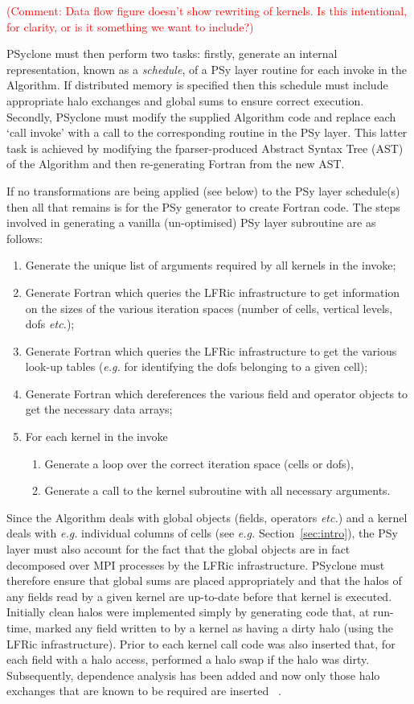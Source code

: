 \documentclass[times]{elsarticle}
\begin{document}
\textcolor{red}{(Comment: Data flow figure doesn't show rewriting of kernels. 
Is this intentional, for clarity, or is it something we want to include?)}

PSyclone must then perform two tasks: firstly, generate an internal
representation, known as a {\em schedule}, of a PSy layer routine for each invoke in
the Algorithm. If distributed memory is specified then this schedule
must include appropriate halo exchanges and global sums to ensure
correct execution. Secondly, PSyclone must modify the supplied Algorithm
code and replace each `call invoke' with a call to the corresponding
routine in the PSy layer. This latter task is achieved by modifying
the fparser-produced Abstract Syntax Tree (AST) of the Algorithm and
then re-generating Fortran from the new AST.

If no transformations are being applied (see below) to the PSy layer
schedule(s) then all that remains is for the PSy generator to create
Fortran code.  The steps involved in generating a vanilla
(un-optimised) PSy layer subroutine are as follows:
\begin{enumerate}
\item Generate the unique list of arguments required by all kernels
  in the invoke;
\item Generate Fortran which queries the LFRic infrastructure to get
  information on the sizes of the various iteration spaces (number of cells,
  vertical levels, dofs {\em etc.});
\item Generate Fortran which queries the LFRic infrastructure to get the
  various look-up tables ({\em e.g.} for identifying the dofs belonging to a
  given cell);
\item Generate Fortran which dereferences the various field and operator
  objects to get the necessary data arrays;
\item For each kernel in the invoke
  \begin{enumerate}
    \item Generate a loop over the correct iteration space (cells or dofs),
    \item Generate a call to the kernel subroutine with all necessary arguments.
  \end{enumerate}
\end{enumerate}

Since the Algorithm deals with global objects
(fields, operators {\em etc.})  and a kernel deals with {\em e.g.} individual
columns of cells (see {\em e.g.} Section~\ref{sec:intro}), 
the PSy layer must also account for the fact that
the global objects are in fact decomposed over MPI processes by the
LFRic infrastructure. PSyclone must therefore ensure that global sums
are placed appropriately and that the halos of any fields read by a
given kernel are up-to-date before that kernel is executed. Initially
clean halos were implemented simply by generating code that, at
run-time, marked any field written to by a kernel as having a dirty
halo (using the LFRic infrastructure). Prior to each kernel call code
was also inserted that, for each field with a halo access, performed a
halo swap if the halo was dirty. Subsequently, dependence analysis has
been added and now only those halo exchanges that are known to be
required are inserted ~\cite{psyclone}.
\end{document}
